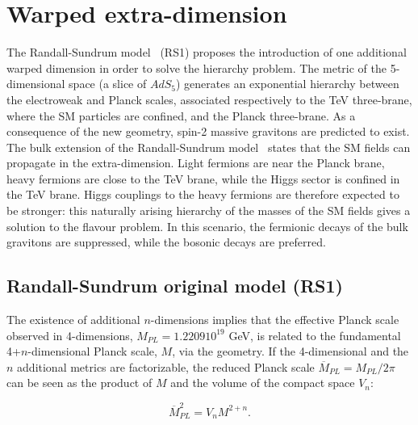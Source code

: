 \clearpage
\section{Warped extra-dimension}
\label{sec:theory_WED}
The Randall-Sundrum model~\cite{Randall:1999ee,Randall:1999vf} (RS1) proposes the introduction of one additional warped dimension in order to solve the hierarchy problem. The metric of the 5-dimensional space (a slice of $AdS_5$) generates an exponential hierarchy between the electroweak and Planck scales, associated respectively to the TeV three-brane, where the SM particles are confined, and the Planck three-brane. As a consequence of the new geometry, spin-2 massive gravitons are predicted to exist.\\
The bulk extension of the Randall-Sundrum model~\cite{Agashe:2007zd,Fitzpatrick:2007qr} states that the SM fields can propagate in the extra-dimension. Light fermions are near the Planck brane, heavy fermions are close to the TeV brane, while the Higgs sector is confined in the TeV brane. Higgs couplings to the heavy fermions are therefore expected to be stronger: this naturally arising hierarchy of the masses of the SM fields gives a solution to the flavour problem. In this scenario, the fermionic decays of the bulk gravitons are suppressed, while the bosonic decays are preferred.

\subsection{Randall-Sundrum original model (RS1)}
\label{sec:RS1}
The existence of additional $n$-dimensions implies that the effective Planck scale observed in 4-dimensions, $M_{PL} = 1.2209 10^{19}$ GeV, is related to the fundamental 4+$n$-dimensional Planck scale, $M$, via the geometry. %
If the 4-dimensional and the $n$ additional metrics are factorizable, the reduced Planck scale $\overline{M}_{PL} = M_{PL}/2 \pi$ can be seen as the product of $M$ and the volume of the compact space $V_n$:

\begin{equation}
\overline{M}_{PL}^2 = V_n M^{2+n}.
\label{eq:theory_planck_mass}
\end{equation}

